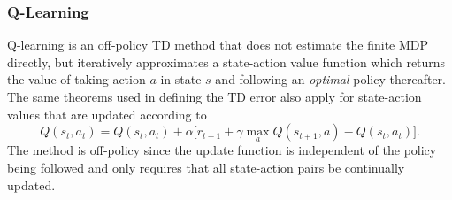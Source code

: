 \subsubsection{Q-Learning}
\label{sec:qlearning}
%
Q-learning is an off-policy TD method that does not estimate the finite
MDP directly, but iteratively approximates a state-action value
function which returns the value of taking action $a$ in state $s$ and
following an \textit{optimal} policy thereafter. The same theorems used in
defining the TD error also apply for state-action values that are updated
according to
\begin{equation}
\label{eq:qlearning}
Q(s_t,a_t) = Q(s_t,a_t) + \alpha \bigl[r_{t+1} + \gamma\max_a
Q(s_{t+1},a)-Q(s_t,a_t) \bigr].
\end{equation}
The method is off-policy since the update function is independent of the policy
being followed and only requires that all state-action pairs be continually
updated.

